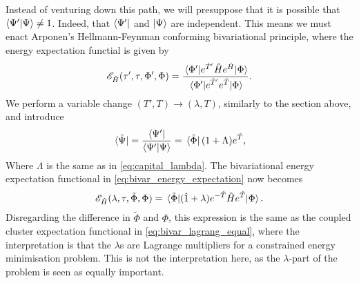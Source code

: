Instead of venturing down this path, we will presuppose that it is possible
that $\braket{{\Psi}'}{\Psi} \neq 1$. Indeed, that $\bra{{\Psi}'}$ 
and $\ket{\Psi}$ are independent. This means we must enact
Arponen's \cite{arponen1983variational} Hellmann-Feynman conforming bivariational 
principle, where the energy expectation functial is given by 
\begin{equation}
    \label{eq:bivar_energy_expectation}
    \mathscr{E}_{\hat{H}}(\tau', \tau, \Phi', \Phi)
    = \frac{\mel*{\Phi'}{e^{\hat{T}'}\hat{H}e^{\hat{H}}}{\Phi}}
    {\mel*{\Phi'}{e^{\hat{T}'}e^{\hat{T}}}{\Phi}}.
\end{equation}
We perform a variable change $(T', T)\to(\lambda, T)$, similarly to the section above, 
and introduce
\begin{equation}
    \bra*{\tilde{\Psi}} = \frac{\bra{\Psi'}}{\braket{\Psi'}{\Psi}}
    = \bra*{\tilde{\Phi}} (1 + \Lambda) e^{\hat{T}},
\end{equation}
Where $\Lambda$ is the same as in \autoref{eq:capital_lambda}.
The bivariational energy expectation functional in \autoref{eq:bivar_energy_expectation}
now becomes
\begin{equation}
    \mathscr{E}_{\hat{H}}(\lambda, \tau, \tilde{\Phi}, \Phi)
    = \mel*{\tilde{\Phi}}{(\hat{1} + \lambda)e^{-\hat{T}}\hat{H}e^{\hat{T}} }{\Phi}.
\end{equation}
Disregarding the difference in $\tilde{\Phi}$ and $\Phi$, this expression is the 
same as the coupled cluster expectation functional in \autoref{eq:bivar_lagrang_equal},
where the interpretation is that the $\lambda$s are Lagrange multipliers 
for a constrained energy minimisation problem. This is not the interpretation 
here, as the $\lambda$-part of the problem is seen as equally important.

